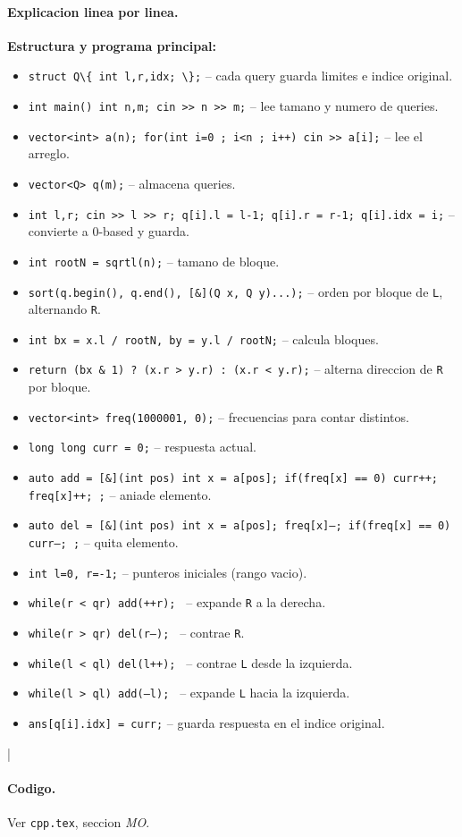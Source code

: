\paragraph{Explicacion linea por linea.}
\textbf{Estructura y programa principal:}
\begin{itemize}\setlength\itemsep{0pt}
	\item \verb|struct Q\{ int l,r,idx; \};| -- cada query guarda limites e indice original.
	\item \texttt{int main(){ int n,m; cin >> n >> m;}} -- lee tamano y numero de queries.
	\item \texttt{vector<int> a(n); for(int i=0 ; i<n ; i++) cin >> a[i];} -- lee el arreglo.
	\item \texttt{vector<Q> q(m);} -- almacena queries.
	\item \texttt{int l,r; cin >> l >> r; q[i].l = l-1; q[i].r = r-1; q[i].idx = i;} -- convierte a 0-based y guarda.
	\item \texttt{int rootN = sqrtl(n);} -- tamano de bloque.
	\item \texttt{sort(q.begin(), q.end(), [\&](Q x, Q y){...});} -- orden por bloque de \texttt{L}, alternando \texttt{R}.
	\item \texttt{int bx = x.l / rootN, by = y.l / rootN;} -- calcula bloques.
	\item \texttt{return (bx \& 1) ? (x.r > y.r) : (x.r < y.r);} -- alterna direccion de \texttt{R} por bloque.
	\item \texttt{vector<int> freq(1000001, 0);} -- frecuencias para contar distintos.
	\item \texttt{long long curr = 0;} -- respuesta actual.
	\item \texttt{auto add = [\&](int pos){ int x = a[pos]; if(freq[x] == 0) curr++; freq[x]++; };} -- aniade elemento.
	\item \texttt{auto del = [\&](int pos){ int x = a[pos]; freq[x]--; if(freq[x] == 0) curr--; };} -- quita elemento.
	\item \texttt{int l=0, r=-1;} -- punteros iniciales (rango vacio).
	\item \texttt{while(r < qr){ add(++r); }} -- expande \texttt{R} a la derecha.
	\item \texttt{while(r > qr){ del(r--); }} -- contrae \texttt{R}.
	\item \texttt{while(l < ql){ del(l++); }} -- contrae \texttt{L} desde la izquierda.
	\item \texttt{while(l > ql){ add(--l); }} -- expande \texttt{L} hacia la izquierda.
	\item \texttt{ans[q[i].idx] = curr;} -- guarda respuesta en el indice original.
\end{itemize}
|\paragraph{Codigo.}
Ver \texttt{cpp.tex}, seccion \textit{MO}.

\vspace{0.5em|||}
